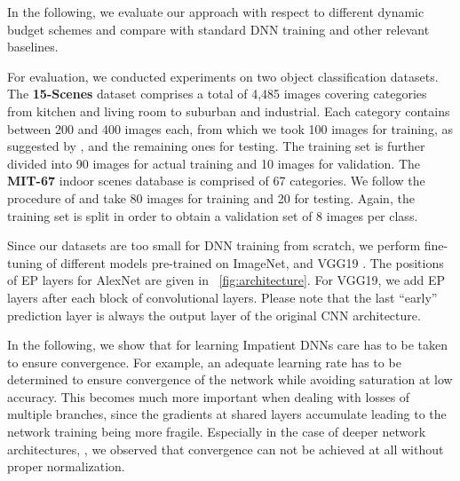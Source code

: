 \documentclass{bmvc2k}
\begin{document}
    In the following, we evaluate our approach with respect to different dynamic budget schemes and compare with
    standard DNN training and other relevant baselines.
    
    
    For evaluation, we conducted experiments on two object classification datasets.
    The \textbf{15-Scenes} \cite{lazebnik2006beyond} dataset comprises a total of 4,485 images covering categories from kitchen and living room to suburban and industrial.
    Each category contains between 200 and 400 images each, from which we took 100 images for training, as suggested by \cite{lazebnik2006beyond},
    and the remaining ones for testing.
    The training set is further divided into 90 images for actual training and 10 images for validation.
%
%
%
    The \textbf{MIT-67} \cite{quattoni2009recognizing} indoor scenes database is comprised of 67 categories.
    We follow the procedure of \cite{quattoni2009recognizing} and take 80 images for training and 20 for testing.
    Again, the training set is split in order to obtain a validation set of 8 images per class.
    

     
    Since our datasets are too small for DNN training from scratch, we perform fine-tuning of different models pre-trained on ImageNet, \eg\AlexNet \cite{krizhevsky2012imagenet} and VGG19 \cite{simonyan2014very}. The positions of EP layers for AlexNet are given in
    \figurename~\ref{fig:architecture}. For VGG19, we add EP layers after each block of convolutional layers. Please note that the last ``early'' prediction layer is always the output layer of the original CNN architecture. 
%
%

    

    In the following, we show that for learning Impatient DNNs care has to be taken to ensure convergence.
    For example, an adequate learning rate has to be determined to ensure convergence of the network while avoiding saturation at low accuracy.
    This becomes much more important when dealing with losses of multiple branches, since the gradients at shared layers accumulate
    leading to the network training being more fragile.
    Especially in the case of deeper network architectures, \eg\VGG, we observed that convergence can not be achieved at all without proper normalization.
\end{document}
